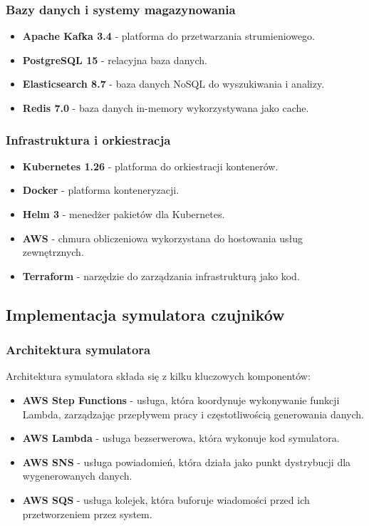 \subsubsection{Bazy danych i systemy magazynowania}
\label{subsubsec:bazy_danych}

\begin{itemize}
    \item \textbf{Apache Kafka 3.4} - platforma do przetwarzania strumieniowego.
    \item \textbf{PostgreSQL 15} - relacyjna baza danych.
    \item \textbf{Elasticsearch 8.7} - baza danych NoSQL do wyszukiwania i analizy.
    \item \textbf{Redis 7.0} - baza danych in-memory wykorzystywana jako cache.
\end{itemize}

\subsubsection{Infrastruktura i orkiestracja}
\label{subsubsec:infrastruktura}

\begin{itemize}
    \item \textbf{Kubernetes 1.26} - platforma do orkiestracji kontenerów.
    \item \textbf{Docker} - platforma konteneryzacji.
    \item \textbf{Helm 3} - menedżer pakietów dla Kubernetes.
    \item \textbf{AWS} - chmura obliczeniowa wykorzystana do hostowania usług zewnętrznych.
    \item \textbf{Terraform} - narzędzie do zarządzania infrastrukturą jako kod.
\end{itemize}

\subsection{Implementacja symulatora czujników}
\label{subsec:implementacja_symulatora}

\subsubsection{Architektura symulatora}
\label{subsubsec:architektura_symulatora}

Architektura symulatora składa się z kilku kluczowych komponentów:

\begin{itemize}
    \item \textbf{AWS Step Functions} - usługa, która koordynuje wykonywanie funkcji Lambda, zarządzając przepływem pracy i częstotliwością generowania danych.
    \item \textbf{AWS Lambda} - usługa bezserwerowa, która wykonuje kod symulatora.
    \item \textbf{AWS SNS} - usługa powiadomień, która działa jako punkt dystrybucji dla wygenerowanych danych.
    \item \textbf{AWS SQS} - usługa kolejek, która buforuje wiadomości przed ich przetworzeniem przez system.
\end{itemize}

